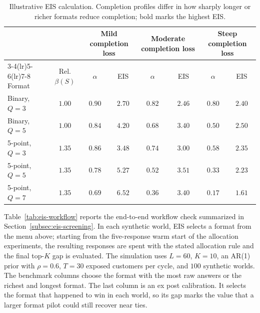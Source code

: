 \documentclass[11pt]{article}
\theoremstyle{definition}
\theoremstyle{remark}
\newcommand{\1}{\mathbf{1}}
\begin{document}
\begin{table}[h!]
\centering
\scriptsize
\setlength{\tabcolsep}{5pt}
\begin{tabular}{lccccccc}
\toprule
\multicolumn{2}{c}{ } & \multicolumn{2}{c}{Mild completion loss} & \multicolumn{2}{c}{Moderate completion loss} & \multicolumn{2}{c}{Steep completion loss} \\
\cmidrule(lr){3-4}\cmidrule(lr){5-6}\cmidrule(lr){7-8}
Format & Rel. $\beta(S)$ & $\alpha$ & EIS & $\alpha$ & EIS & $\alpha$ & EIS \\
\midrule
Binary, $Q=3$  & $1.00$ & $0.90$ & $2.70$ & $0.82$ & $2.46$ & $0.80$ & $2.40$ \\
Binary, $Q=5$  & $1.00$ & $0.84$ & $4.20$ & $0.68$ & $3.40$ & $0.50$ & $\mathbf{2.50}$ \\
5-point, $Q=3$ & $1.35$ & $0.86$ & $3.48$ & $0.74$ & $3.00$ & $0.58$ & $2.35$ \\
5-point, $Q=5$ & $1.35$ & $0.78$ & $5.27$ & $0.52$ & $\mathbf{3.51}$ & $0.33$ & $2.23$ \\
5-point, $Q=7$ & $1.35$ & $0.69$ & $\mathbf{6.52}$ & $0.36$ & $3.40$ & $0.17$ & $1.61$ \\
\bottomrule
\end{tabular}
\caption{Illustrative EIS calculation. Completion profiles differ in how sharply longer or richer formats reduce completion; bold marks the highest EIS.}
\label{tab:eis-illustration}
\end{table}

Table~\ref{tab:eis-workflow} reports the end-to-end workflow check
summarized in Section~\ref{subsec:eis-screening}. In each synthetic
world, EIS selects a format from the menu above; starting from the
five-response warm start of the allocation experiments, the resulting
responses are spent with the stated allocation rule and the final
top-\(K\) gap is evaluated. The simulation uses \(L=60\), \(K=10\),
an AR(1) prior with \(\rho=0.6\), \(T=30\) exposed customers per
cycle, and \(100\) synthetic worlds. The benchmark columns choose the
format with the most raw answers or the richest and longest format. The
last column is an ex post calibration. It selects the format that
happened to win in each world, so its gap marks the value that a larger
format pilot could still recover near ties.
\end{document}
